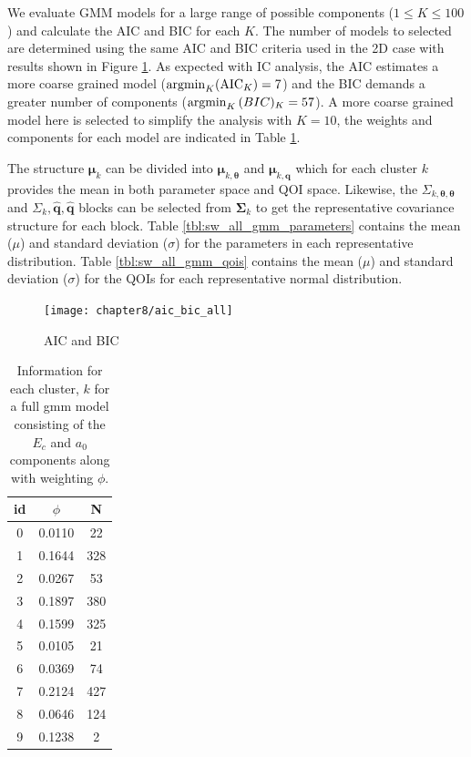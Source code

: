 We evaluate GMM models for a large range of possible components ($1 \leq K \leq 100$) and calculate the AIC and BIC for each $K$.  The number of models to selected are determined using the same AIC and BIC criteria used in the 2D case with results shown in
Figure \ref{fig:Si_aic_bic_all}.  As expected with IC analysis, the AIC estimates a more coarse grained model ($\operatorname*{argmin}_K(\text{AIC}_K) = 7$) and the BIC demands a greater number of components ($\operatorname*{argmin}_K{\text(BIC)_K} = 57$).
A more coarse grained model here is selected to simplify the analysis with $K=10$, the weights and components for each model are indicated in Table \ref{tbl:sw_all_gmm}.

The structure $\bm{\mu}_k$ can be divided into $\bm{\mu}_{k,\bm{\theta}}$ and $\bm{\mu}_{k,\hat{\bm{q}}}$ which for each cluster $k$ provides the mean in both parameter space and QOI space.
Likewise, the $\Sigma_{k,\bm{\theta}, \bm{\theta}}$ and $\Sigma_{k},\hat{\bm{q}}, \hat{\bm{q}}$ blocks can be selected from $\bm{\Sigma}_k$ to get the representative covariance structure for each block.
Table \ref{tbl:sw_all_gmm_parameters} contains the mean ($\mu$) and standard deviation ($\sigma$) for the parameters in each representative distribution.  Table \ref{tbl:sw_all_gmm_qois} contains the mean ($\mu$) and standard deviation ($\sigma$) for the QOIs for each representative normal distribution.


\begin{figure}[hbt]
	\centering
	\captionsetup{justification=centering,margin=1in}
	\texttt{[image: chapter8/aic\_bic\_all]}
	\caption{AIC and BIC}
	\label{fig:Si_aic_bic_all}
\end{figure}

\begin{table}[ht]
	\centering
	\caption{Information for each cluster, $k$  for a full gmm model consisting of the $E_c$ and $a_0$ components along with weighting $\phi$.}
	\label{tbl:sw_all_gmm}
	\begin{tabular}{c c c}
    \hline
    id & $\phi$ & N\\
    \hline
    0 & 0.0110 & 22\\
    1 & 0.1644 & 328\\
    2 & 0.0267 & 53\\
    3 & 0.1897 & 380\\
    4 & 0.1599 & 325\\
    5 & 0.0105 & 21 \\
    6 & 0.0369 & 74 \\
    7 & 0.2124 & 427 \\
    8 & 0.0646 & 124 \\
    9 & 0.1238 & 2 \\
    \hline
  \end{tabular}
\end{table}

